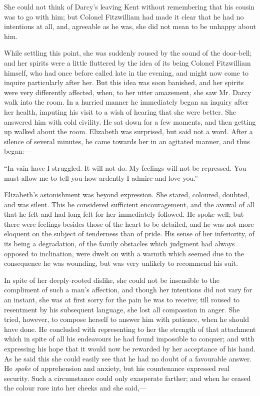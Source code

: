 \documentclass[12pt,openright]{book}
\begin{document}
She could not think of Darcy’s leaving Kent without remembering that his cousin was to go with him; but Colonel Fitzwilliam had made it clear that he had no intentions at all, and, agreeable as he was, she did not mean to be unhappy about him.

While settling this point, she was suddenly roused by the sound of the door-bell; and her spirits were a little fluttered by the idea of its being Colonel Fitzwilliam himself, who had once before called late in the evening, and might now come to inquire particularly after her. But this idea was soon banished, and her spirits were very differently affected, when, to her utter amazement, she saw Mr. Darcy walk into the room. In a hurried manner he immediately began an inquiry after her health, imputing his visit to a wish of hearing that she were better. She answered him with cold civility. He sat down for a few moments, and then getting up walked about the room. Elizabeth was surprised, but said not a word. After a silence of several minutes, he came towards her in an agitated manner, and thus began:—

“In vain have I struggled. It will not do. My feelings will not be repressed. You must allow me to tell you how ardently I admire and love you.”

Elizabeth’s astonishment was beyond expression. She stared, coloured, doubted, and was silent. This he considered sufficient encouragement, and the avowal of all that he felt and had long felt for her immediately followed. He spoke well; but there were feelings besides those of the heart to be detailed, and he was not more eloquent on the subject of tenderness than of pride. His sense of her inferiority, of its being a degradation, of the family obstacles which judgment had always opposed to inclination, were dwelt on with a warmth which seemed due to the consequence he was wounding, but was very unlikely to recommend his suit.

In spite of her deeply-rooted dislike, she could not be insensible to the compliment of such a man’s affection, and though her intentions did not vary for an instant, she was at first sorry for the pain he was to receive; till roused to resentment by his subsequent language, she lost all compassion in anger. She tried, however, to compose herself to answer him with patience, when he should have done. He concluded with representing to her the strength of that attachment which in spite of all his endeavours he had found impossible to conquer; and with expressing his hope that it would now be rewarded by her acceptance of his hand. As he said this she could easily see that he had no doubt of a favourable answer. He \textit{spoke} of apprehension and anxiety, but his countenance expressed real security. Such a circumstance could only exasperate farther; and when he ceased the colour rose into her cheeks and she said,—
\end{document}
